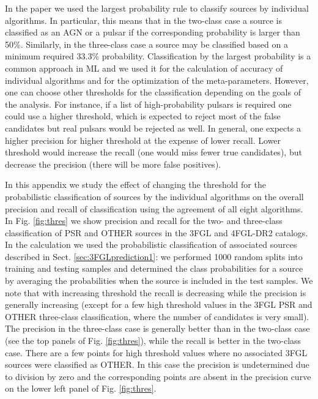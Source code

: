 \documentclass[referee]{aa} %
\begin{document}
\begin{appendix}
In the paper we used the largest probability rule to classify sources by individual algorithms.
In particular, this means that in the two-class case a source is classified as an AGN or a pulsar if the corresponding probability
is larger than 50\%. Similarly, in the three-class case a source may be classified based on a minimum required 33.3\% probability.
Classification by the largest probability is a common approach in ML and we used it
for the calculation of accuracy of individual algorithms and for the optimization of the meta-parameters. 
However, one can choose other thresholds for the classification depending on the goals of the analysis.
For instance, if a list of high-probability pulsars is required one could use a higher threshold, 
which is expected to reject most of the false candidates but real pulsars would be rejected as well. 
In general, one expects a higher precision for higher threshold
at the expense of lower recall.
Lower threshold would increase the recall (one would miss fewer true candidates), 
but decrease the precision (there will be more false positives).



In this appendix we study the effect of changing the threshold for the probabilistic classification of sources by the individual
algorithms on the overall precision and recall of classification using the agreement of all eight algorithms.
In Fig. \ref{fig:thres} we show precision and recall for the two- and three-class classification of PSR and OTHER sources in the 3FGL and 4FGL-DR2 catalogs.
In the calculation we used the probabilistic classification of associated sources described in Sect. \ref{sec:3FGLprediction1}: we performed 1000 random splits into training and testing samples and determined the class probabilities for a source by averaging the probabilities when the source is included in the test samples.
We note that with increasing threshold the recall is decreasing while the precision is generally increasing  (except for a few high threshold values in the 3FGL PSR and OTHER three-class classification, where the number of candidates is very small).
The precision in the three-class case is generally better than in the two-class case (see the top panels of Fig. \ref{fig:thres}),
while the recall is better in the two-class case.
There are a few points for high threshold values where no associated 3FGL sources were classified as OTHER.
In this case the precision is undetermined due to division by zero and the corresponding points are absent in the precision curve
on the lower left panel of Fig. \ref{fig:thres}.



\end{appendix}
\end{document}

